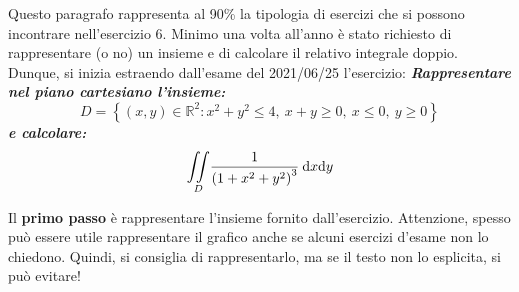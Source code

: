 \documentclass[a4paper]{article}
\begin{document}
	Questo paragrafo rappresenta al 90\% la tipologia di esercizi che si possono incontrare nell'esercizio 6. Minimo una volta all'anno è stato richiesto di rappresentare (o no) un insieme e di calcolare il relativo integrale doppio. Dunque, si inizia estraendo dall'esame del 2021/06/25 l'esercizio: \textcolor{Green4}{\textbf{\emph{Rappresentare nel piano cartesiano l'insieme:}}
	\begin{equation*}
		D = \left\{\left(x,y\right) \in \mathbb{R}^{2} : x^{2}+y^{2} \le 4, \: x+y \ge 0, \: x \le 0, \: y \ge 0\right\}
	\end{equation*}
	\textbf{\emph{e calcolare:}}
	\begin{equation*}
		\underset{D}{\int \hspace{-.5em} \int} \dfrac{1}{\left(1 + x^{2} + y^{2}\right)^{3}} \: \mathrm{d}x \mathrm{d}y
	\end{equation*}}\newline

	\noindent
	Il \textbf{primo passo} è rappresentare l'insieme fornito dall'esercizio. Attenzione, spesso può essere utile rappresentare il grafico anche se alcuni esercizi d'esame non lo chiedono. Quindi, si consiglia di rappresentarlo, ma se il testo non lo esplicita, si può evitare!
\end{document}
